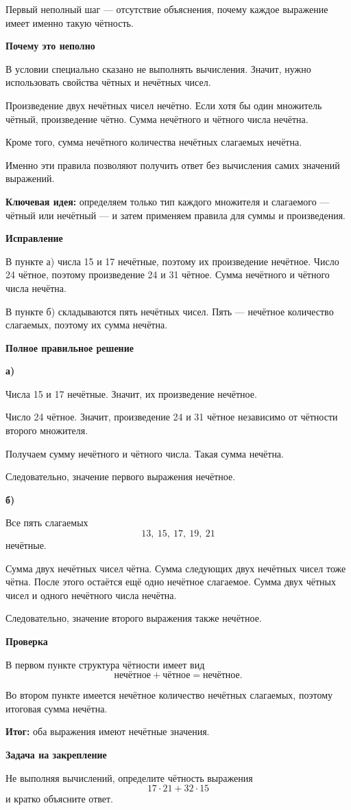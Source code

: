 \documentclass[12pt,a4paper]{article}
\newcommand{\idea}{\textcolor{blue!60!black}{Ключевая идея:}}
\newcommand{\result}{\textcolor{teal!60!black}{Итог:}}
\begin{document}
Первый неполный шаг --- отсутствие объяснения, почему каждое выражение имеет именно такую чётность.

\textbf{Почему это неполно}

В условии специально сказано не выполнять вычисления. Значит, нужно использовать свойства чётных и нечётных чисел.

Произведение двух нечётных чисел нечётно. Если хотя бы один множитель чётный, произведение чётно. Сумма нечётного и чётного числа нечётна.

Кроме того, сумма нечётного количества нечётных слагаемых нечётна.

Именно эти правила позволяют получить ответ без вычисления самих значений выражений.

\textbf{\idea} определяем только тип каждого множителя и слагаемого --- чётный или нечётный --- и затем применяем правила для суммы и произведения.

\textbf{Исправление}

В пункте а) числа 15 и 17 нечётные, поэтому их произведение нечётное. Число 24 чётное, поэтому произведение 24 и 31 чётное. Сумма нечётного и чётного числа нечётна.

В пункте б) складываются пять нечётных чисел. Пять --- нечётное количество слагаемых, поэтому их сумма нечётна.

\textbf{Полное правильное решение}

\textbf{а)}

Числа 15 и 17 нечётные. Значит, их произведение нечётное.

Число 24 чётное. Значит, произведение 24 и 31 чётное независимо от чётности второго множителя.

Получаем сумму нечётного и чётного числа. Такая сумма нечётна.

Следовательно, значение первого выражения нечётное.

\textbf{б)}

Все пять слагаемых
\[
13,\ 15,\ 17,\ 19,\ 21
\]
нечётные.

Сумма двух нечётных чисел чётна. Сумма следующих двух нечётных чисел тоже чётна. После этого остаётся ещё одно нечётное слагаемое. Сумма двух чётных чисел и одного нечётного числа нечётна.

Следовательно, значение второго выражения также нечётное.

\textbf{Проверка}

В первом пункте структура чётности имеет вид
\[
\text{нечётное}+\text{чётное}=\text{нечётное}.
\]

Во втором пункте имеется нечётное количество нечётных слагаемых, поэтому итоговая сумма нечётна.

\textbf{\result} оба выражения имеют нечётные значения.

\textbf{Задача на закрепление}

Не выполняя вычислений, определите чётность выражения
\[
17\cdot21+32\cdot15
\]
и кратко объясните ответ.
\end{document}
